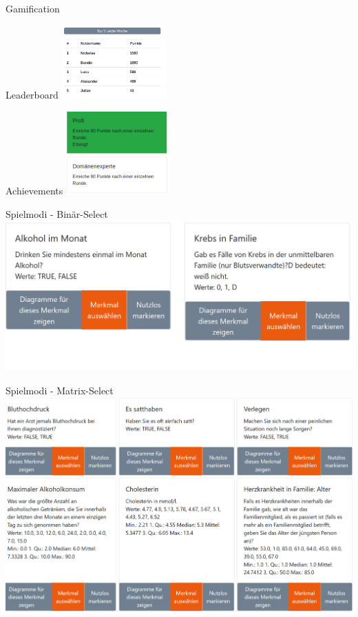 \documentclass[xcolor=dvipsnames]{beamer}
\begin{document}
    \begin{frame}{Gamification}
        \begin{block}{Leaderboard}
        \center
        \includegraphics[width=0.3\textwidth]{img/leaderboard.png}
        \end{block}
        \begin{block}{Achievements}
        \center
        \includegraphics[width=0.3\textwidth]{img/achievment.png}
        \end{block}
    \end{frame}
   \begin{frame}{Spielmodi - Binär-Select}
        \includegraphics[width=\textwidth]{img/binary.png}
    \end{frame}
    \begin{frame}{Spielmodi - Matrix-Select}
        \includegraphics[width=\textwidth]{img/matrix.png}
    \end{frame}
\end{document}

